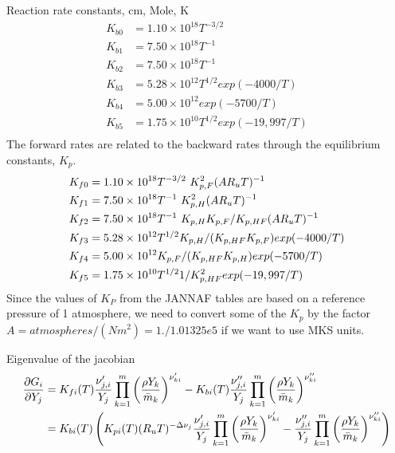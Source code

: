 \documentclass[10pt]{article}
\begin{document}
Reaction rate constants, cm, Mole, K
\begin{align*}
   K_{b0} &=  1.10 \times 10^{18} T^{-3/2} \\
   K_{b1} &=  7.50 \times 10^{18} T^{-1} \\
   K_{b2} &=  7.50 \times 10^{18} T^{-1} \\
   K_{b3} &=  5.28 \times 10^{12} T^{1/2} exp(-4000/T) \\
   K_{b4} &=  5.00 \times 10^{12} exp(-5700/T) \\
   K_{b5} &=  1.75 \times 10^{10} T^{1/2} exp(-19,997/T)\\
\end{align*}   
The forward rates are related to the backward rates through the equilibrium constants, $K_p$.
\begin{align*}
   K_{f0} &=  1.10 \times 10^{18} T^{-3/2} ~K_{p,F}^2 (A R_u T)^{-1} \\
   K_{f1} &=  7.50 \times 10^{18} T^{-1}~K_{p,H}^2 (A R_u T)^{-1}  \\
   K_{f2} &=  7.50 \times 10^{18} T^{-1}~K_{p,H} K_{p,F}/K_{p,HF} (A R_u T)^{-1}  \\
   K_{f3} &=  5.28 \times 10^{12} T^{1/2} K_{p,H}/(K_{p,HF} K_{p,F})exp(-4000/T)  \\
   K_{f4} &=  5.00 \times 10^{12} K_{p,F}/(K_{p,HF} K_{p,H}) exp(-5700/T)  \\
   K_{f5} &=  1.75 \times 10^{10} T^{1/2} 1/K_{p,HF}^2 exp(-19,997/T)
\end{align*}   
Since the values of $K_P$ from the JANNAF tables are based on a reference pressure of
1 atmosphere, we need to convert some of the $K_p$ by the factor $A= atmospheres/(N m^2)=1./1.01325e5$ if
we want to use MKS units.

Eigenvalue of the jacobian
\begin{align*}
    {\partial G_i \over \partial Y_j} &= 
            K_{fi}(T) {\nu_{j,i}' \over Y_j}  \prod_{k=1}^{m} \left({\rho Y_k \over \bar{m}_k} \right)^{\nu_{ki}'}
         -  K_{bi}(T){\nu_{j,i}''\over Y_j}  \prod_{k=1}^{m}  \left({\rho Y_k \over \bar{m}_k} \right)^{\nu_{ki}''} \\
    &=  K_{bi}(T) \left(
            K_{pi}(T)(R_u T)^{-\Delta \nu_j}
                     {\nu_{j,i}' \over Y_j}  \prod_{k=1}^{m} \left({\rho Y_k \over \bar{m}_k} \right)^{\nu_{ki}'}
         -           {\nu_{j,i}''\over Y_j}  \prod_{k=1}^{m}  \left({\rho Y_k \over \bar{m}_k} \right)^{\nu_{ki}''}
                  \right) \\
\end{align*}
\end{document}
